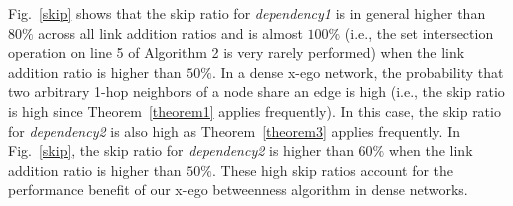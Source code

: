 Fig.~\ref{skip} shows that the skip ratio for {\em dependency1} is in general higher than $80\%$ across all link addition ratios and is almost $100\%$ (i.e., the set intersection operation on line 5 of Algorithm 2 is very rarely performed) when the link addition ratio is higher than $50\%$. 
In a dense x-ego network, the probability that two arbitrary 1-hop neighbors of a node share an edge is high (i.e., the skip ratio is high since Theorem~\ref{theorem1} applies frequently).
In this case, the skip ratio for {\em dependency2} is also high as Theorem~\ref{theorem3} applies frequently.
In Fig.~\ref{skip}, the skip ratio for {\em dependency2} is higher than $60\%$ when the link addition ratio is higher than $50\%$. 
These high skip ratios account for the performance benefit of our x-ego betweenness algorithm in dense networks.



